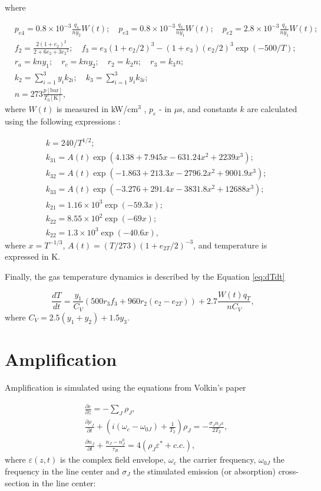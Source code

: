 \documentclass{report}
\begin{document}
where

\begin{align*}
&p_{e4} = 0.8\times 10^{-3} \frac{q_4}{n y_2} W(t);\quad p_{e3} = 0.8\times 10^{-3}\frac{q_3}{n y_1} W(t);\quad p_{e2} = 2.8\times 10^{-3}\frac{q_2}{n y_1} W(t);\\
&f_2 = \frac{2(1+e_2)^2}{2+6e_2+3{e_2}^2};\quad f_3 = e_3(1+e_2/2)^3 - (1+e_3)(e_2/2)^3 \exp(- 500/T);\\
&r_a = kny_1;\quad r_c = kny_2;\quad r_2 = k_2n;\quad r_3 = k_3n;\\
&k_2 = \sum\limits_{i=1}^3 y_i k_{2i};\quad k_3 = \sum\limits_{i=1}^3 y_i k_{3i};\\
&n = 273 \frac{p[\text{bar}]}{T_0[\text{K}]},
\end{align*}
where $W(t)$ is measured in {kW/cm$^3$} , $p_e$ - in {$\mu$s}, and constants $k$ are calculated using the following expressions \cite{Biryukov-1974,Taylor-1969}:

\begin{align*}
&k = 240 / T^{1/2};\\
&k_{31} = A(t)\exp(4.138 + 7.945x - 631.24x^2 + 2239x^3);\\
&k_{32} = A(t)\exp(-1.863 + 213.3x - 2796.2x^2 + 9001.9x^3);\\
&k_{33} = A(t)\exp(-3.276 + 291.4x - 3831.8x^2 + 12688x^3);\\
&k_{21} = 1.16 \times 10^3 \exp(-59.3x);\\
&k_{22} = 8.55 \times 10^2 \exp(-69x);\\
&k_{22} = 1.3 \times 10^3 \exp(-40.6x),
\end{align*}
where $x=T^{-1/3}$, $A(t)=(T/273)(1+e_{2T}/2)^{-3}$, and temperature is expressed in K.


Finally, the gas temperature dynamics is described by the Equation \ref{eq:dTdt}

\begin{equation}\label{eq:dTdt}
\frac{dT}{dt} = \frac{y_1}{C_V}(500r_3f_3 + 960r_2(e_2-e_{2T})) + 2.7\frac{W(t)q_T}{nC_V},
\end{equation}
where $C_V = 2.5(y_1+y_2) + 1.5y_3$.


\section{Amplification}
Amplification is simulated using the equations from Volkin’s paper \cite{Volkin-1979}

\begin{align}\label{eq:amplification}
&\frac{\partial \varepsilon}{\partial z} =  - \sum\limits_J {\rho _J},\nonumber\\
&\frac{\partial \rho _J}{\partial t} + \left(i(\omega _c-\omega _{0J}) + \frac{1}{T_2} \right)\rho _J =  - \frac{\sigma _J n_J \varepsilon}{2T_2},\\
&\frac{\partial n_J}{\partial t} + \frac{n_J-n_J^0}{\tau _R} = 4(\rho _J \varepsilon^* + c.c.), \nonumber
\end{align}
where $\varepsilon(z,t)$ is the complex field envelope, $\omega _c$ the carrier frequency, $\omega_{0J}$ the frequency in the line center and $\sigma_J$ the stimulated emission (or absorption) cross-section in the line center:
\end{document}
